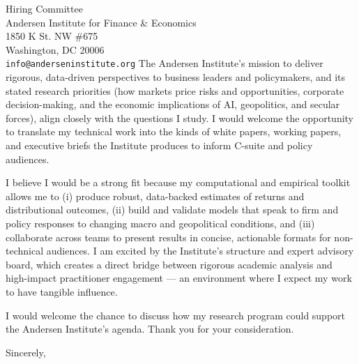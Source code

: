 \documentclass[11pt,letterpaper]{letter}
\begin{document}
\begin{letter}{Hiring Committee \\
Andersen Institute for Finance \& Economics \\
1850 K St. NW \#675 \\
Washington, DC 20006 \\
\texttt{info@anderseninstitute.org}}
The Andersen Institute’s mission to deliver rigorous, data-driven perspectives to business leaders and policymakers, and its stated research priorities (how markets price risks and opportunities, corporate decision-making, and the economic implications of AI, geopolitics, and secular forces), align closely with the questions I study. I would welcome the opportunity to translate my technical work into the kinds of white papers, working papers, and executive briefs the Institute produces to inform C-suite and policy audiences.

I believe I would be a strong fit because my computational and empirical toolkit allows me to (i) produce robust, data-backed estimates of returns and distributional outcomes, (ii) build and validate models that speak to firm and policy responses to changing macro and geopolitical conditions, and (iii) collaborate across teams to present results in concise, actionable formats for non-technical audiences. I am excited by the Institute’s structure and expert advisory board, which creates a direct bridge between rigorous academic analysis and high-impact practitioner engagement — an environment where I expect my work to have tangible influence. 

I would welcome the chance to discuss how my research program could support the Andersen Institute’s agenda. Thank you for your consideration.




\closing{Sincerely,}

\end{letter}
\end{document}
